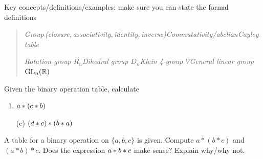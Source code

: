 \begin{exercises}
	Key concepts/definitions/examples: make sure you can state the formal definitions
	\begin{quote}
		\emph{Group\,(closure,\,associativity,\,identity,\,inverse)\quad Commutativity/abelian\quad Cayley table}\par
		\emph{Rotation group $R_n$\quad Dihedral group $D_n$\quad Klein 4-group $V$\quad General linear group $\mathrm{GL}_n(\mathbb{R})$}
	\end{quote}


	\begin{enumerate}
	  \begin{minipage}[t]{0.72\linewidth}\vspace{-5pt}
			\item Given the binary operation table, calculate
			\begin{enumerate}\itemsep0pt
				\item {} $a\mathbin{\ast} (c\mathbin{\ast} b)$
				\item[(c)]  $(d\mathbin{\ast} c)\mathbin{\ast} (b\mathbin{\ast} a)$
			\end{enumerate}
		\end{minipage}
		\hfill
		\begin{minipage}[t]{0.2\linewidth}\vspace{-5pt}
			\flushright {}
		\end{minipage}
		\smallbreak
	
	
		\begin{minipage}[t]{0.72\linewidth}\vspace{0pt}
			\item A table for a binary operation on $\{a,b,c\}$ is given. Compute $a*(b*c)$ and $(a*b)*c$. Does the expression $a\mathbin{\ast} b\mathbin{\ast} c$ make sense? Explain why/why not.
			\end{minipage}
			\hfill
			\begin{minipage}[t]{0.2\linewidth}\vspace{0pt}
				\flushright{}
		\end{minipage}
		\par
	

\end{enumerate}
\end{exercises}
